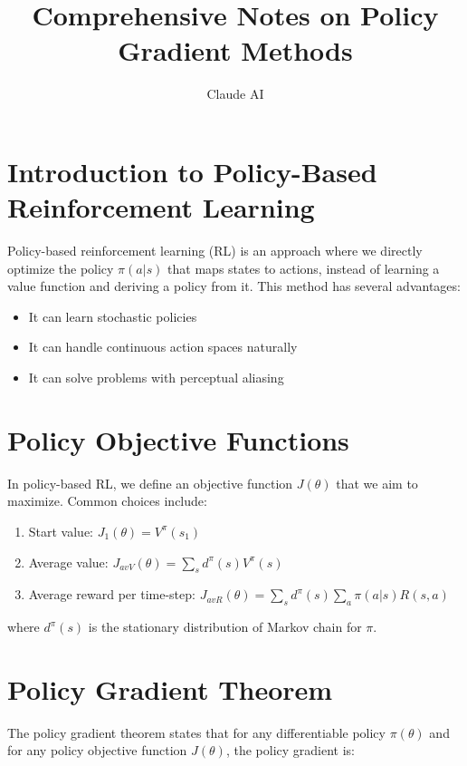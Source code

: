 \documentclass{article}
\title{Comprehensive Notes on Policy Gradient Methods}
\author{Claude AI}
\date{}
\begin{document}
\maketitle

\section{Introduction to Policy-Based Reinforcement Learning}

Policy-based reinforcement learning (RL) is an approach where we directly optimize the policy $\pi(a|s)$ that maps states to actions, instead of learning a value function and deriving a policy from it. This method has several advantages:

\begin{itemize}
    \item It can learn stochastic policies
    \item It can handle continuous action spaces naturally
    \item It can solve problems with perceptual aliasing
\end{itemize}

\section{Policy Objective Functions}

In policy-based RL, we define an objective function $J(\theta)$ that we aim to maximize. Common choices include:

\begin{enumerate}
    \item Start value: $J_1(\theta) = V^\pi(s_1)$
    \item Average value: $J_{avV}(\theta) = \sum_s d^\pi(s)V^\pi(s)$
    \item Average reward per time-step: $J_{avR}(\theta) = \sum_s d^\pi(s)\sum_a \pi(a|s)R(s,a)$
\end{enumerate}

where $d^\pi(s)$ is the stationary distribution of Markov chain for $\pi$.

\section{Policy Gradient Theorem}

The policy gradient theorem states that for any differentiable policy $\pi(\theta)$ and for any policy objective function $J(\theta)$, the policy gradient is:
\end{document}

